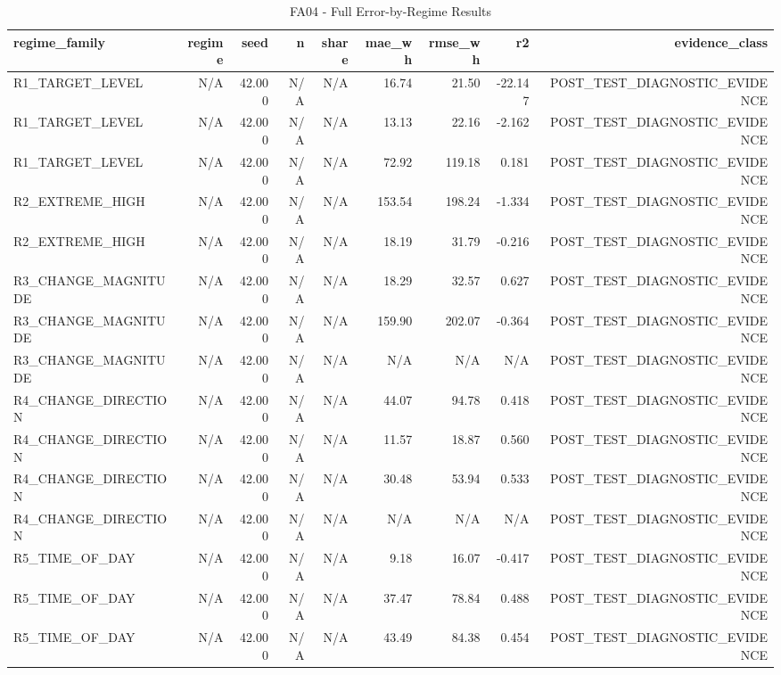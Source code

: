 \begin{table}[h!]
\centering
\caption{FA04 - Full Error-by-Regime Results}
\label{tab:fa04\_-\_full\_error-by-regime\_results}
\begin{tabular}{lrrrrrrrr}
\toprule
regime\_family & regime & seed & n & share & mae\_wh & rmse\_wh & r2 & evidence\_class \\
\midrule
R1\_TARGET\_LEVEL & N/A & 42.000 & N/A & N/A & 16.74 & 21.50 & -22.147 & POST\_TEST\_DIAGNOSTIC\_EVIDENCE \\
R1\_TARGET\_LEVEL & N/A & 42.000 & N/A & N/A & 13.13 & 22.16 & -2.162 & POST\_TEST\_DIAGNOSTIC\_EVIDENCE \\
R1\_TARGET\_LEVEL & N/A & 42.000 & N/A & N/A & 72.92 & 119.18 & 0.181 & POST\_TEST\_DIAGNOSTIC\_EVIDENCE \\
R2\_EXTREME\_HIGH & N/A & 42.000 & N/A & N/A & 153.54 & 198.24 & -1.334 & POST\_TEST\_DIAGNOSTIC\_EVIDENCE \\
R2\_EXTREME\_HIGH & N/A & 42.000 & N/A & N/A & 18.19 & 31.79 & -0.216 & POST\_TEST\_DIAGNOSTIC\_EVIDENCE \\
R3\_CHANGE\_MAGNITUDE & N/A & 42.000 & N/A & N/A & 18.29 & 32.57 & 0.627 & POST\_TEST\_DIAGNOSTIC\_EVIDENCE \\
R3\_CHANGE\_MAGNITUDE & N/A & 42.000 & N/A & N/A & 159.90 & 202.07 & -0.364 & POST\_TEST\_DIAGNOSTIC\_EVIDENCE \\
R3\_CHANGE\_MAGNITUDE & N/A & 42.000 & N/A & N/A & N/A & N/A & N/A & POST\_TEST\_DIAGNOSTIC\_EVIDENCE \\
R4\_CHANGE\_DIRECTION & N/A & 42.000 & N/A & N/A & 44.07 & 94.78 & 0.418 & POST\_TEST\_DIAGNOSTIC\_EVIDENCE \\
R4\_CHANGE\_DIRECTION & N/A & 42.000 & N/A & N/A & 11.57 & 18.87 & 0.560 & POST\_TEST\_DIAGNOSTIC\_EVIDENCE \\
R4\_CHANGE\_DIRECTION & N/A & 42.000 & N/A & N/A & 30.48 & 53.94 & 0.533 & POST\_TEST\_DIAGNOSTIC\_EVIDENCE \\
R4\_CHANGE\_DIRECTION & N/A & 42.000 & N/A & N/A & N/A & N/A & N/A & POST\_TEST\_DIAGNOSTIC\_EVIDENCE \\
R5\_TIME\_OF\_DAY & N/A & 42.000 & N/A & N/A & 9.18 & 16.07 & -0.417 & POST\_TEST\_DIAGNOSTIC\_EVIDENCE \\
R5\_TIME\_OF\_DAY & N/A & 42.000 & N/A & N/A & 37.47 & 78.84 & 0.488 & POST\_TEST\_DIAGNOSTIC\_EVIDENCE \\
R5\_TIME\_OF\_DAY & N/A & 42.000 & N/A & N/A & 43.49 & 84.38 & 0.454 & POST\_TEST\_DIAGNOSTIC\_EVIDENCE \\

\end{tabular}
\end{table}

